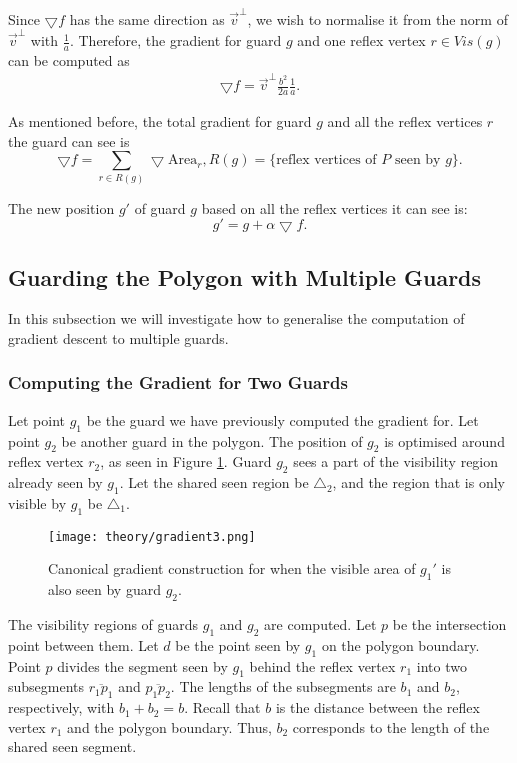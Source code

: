 Since $\bigtriangledown f$ has the same direction as $\vec v^\perp$, we wish to normalise it from the norm of $\vec v^\perp$ with $\frac 1 a$. Therefore, the gradient for guard $g$ and one reflex vertex $r \in \mathit{Vis}(g)$ can be computed as 
\begin{align}
    \bigtriangledown f = \vec v^\perp \frac{b^2}{2a} \frac 1 a. \label{eq:f}
\end{align}

As mentioned before, the total gradient for guard $g$ and all the reflex vertices $r$ the guard can see is $$\bigtriangledown f = \sum_{r \in R(g)} \bigtriangledown \text{Area}_r, R(g) = \{\text{reflex vertices of } P \text{ seen by }g\}.$$

The new position $g'$ of guard $g$ based on all the reflex vertices it can see is: 
\begin{equation}
    g' = g + \alpha\bigtriangledown f.
    \label{eq:l}
\end{equation}

\newpage
\subsection{Guarding the Polygon with Multiple Guards}
In this subsection we will investigate how to generalise the computation of gradient descent to multiple guards.

\subsubsection{Computing the Gradient for Two Guards}
Let point $g_1$ be the guard we have previously computed the gradient for. Let point $g_2$ be another guard in the polygon. The position of $g_2$ is optimised around reflex vertex $r_2$, as seen in Figure \ref{fig:poly_gradient}. Guard $g_2$ sees a part of the visibility region already seen by $g_1$. Let the shared seen region be $\triangle_2$, and the region that is only visible by $g_1$ be $\triangle_1$.

\begin{figure}[h!]
    \centering
    \texttt{[image: theory/gradient3.png]}
    \caption{Canonical gradient construction for when the visible area of $g_1'$ is also seen by guard $g_2$.}
    \label{fig:poly_gradient}
\end{figure}

The visibility regions of guards $g_1$ and $g_2$ are computed. Let $p$ be the intersection point between them. Let $d$ be the point seen by $g_1$ on the polygon boundary. Point $p$ divides the segment seen by $g_1$ behind the reflex vertex $r_1$ into two subsegments $\overline{r_1p_1}$ and $\overline{p_1p_2}$. The lengths of the subsegments are $b_1$ and $b_2$, respectively, with $b_1 + b_2 = b$. Recall that $b$ is the distance between the reflex vertex $r_1$ and the polygon boundary. Thus,  $b_2$ corresponds to the length of the shared seen segment.

